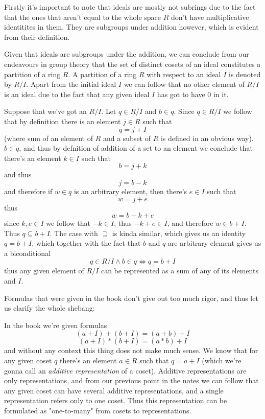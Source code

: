\documentclass[11pt,oneside,titlepage]{book}
\DeclareMathOperator \lra {\Leftrightarrow}
\begin{document}
Firstly it's important to note that ideals are mostly not subrings due
to the fact that the ones that aren't equal to the whole space $R$
don't have multiplicative identitites in them. They are subgroups
under addition however, which is evident from their definition.

Given that ideals are subgroups under the addition, we can conclude
from our endeavours in group theory that the set of distinct cosets of
an ideal constitutes a partition of a ring $R$. A partition of a ring
$R$ with respect to an ideal $I$ is denoted by $R/I$. Apart from the
initial ideal $I$ we can follow that no other element of $R/I$ is an
ideal due to the fact that any given ideal $I$ has got to have $0$ in
it.

Suppose that we've got an $R/I$. Let $q \in R/I$ and $b \in q$.  Since
$q \in R/I$ we follow that by definition there is an element $j \in R$
such that
$$q = j + I$$
(where sum of an element of $R$ and a subset of $R$ is defined in an
obvious way). $b \in q$, and thus by defnition of addition of a set to
an element we conclude that there's an element $k \in I$ such that
$$b = j + k$$
and thus
$$j = b - k$$
and therefore if $w \in q$ is an arbitrary element, then there's $e
\in I$ such that
$$w = j + e$$ 
thus
$$w = b - k + e$$
since $k, e \in I$ we follow that $-k \in I$, thus $-k + e \in I$, and
therefore $w \in b + I$. Thus $q \subseteq b + I$. The case with
$\supseteq$ is kinda similar, which gives us an identity $q = b + I$,
which together with the fact that $b$ and $q$ are arbitrary element
gives us a biconditional
$$q \in R/I \land b \in q \lra q = b + I$$
thus any given element of $R/I$ can be represented as a sum of any of
its elements and $I$.

Formulas that were given in the book don't give out too much rigor,
and thus let us clarify the whole shebang:

In the book we're given formulas
$$(a + I) + (b + I) = (a + b) + I$$
$$(a + I) * (b + I) = (a * b) + I$$
and without any context this thing does not make much sense. We know
that for any given coset $q$ there's an element $a \in R$ such that $q
= a + I$ (which we're gonna call an \textit{additive representation}
of a coset). Additive representations are only representations, and
from our previous point in the notes we can follow that any given
coset can have several additive representations, and a single
representation refers only to one coset. Thus this representation can
be formulated as "one-to-many" from cosets to representations.
\end{document}
